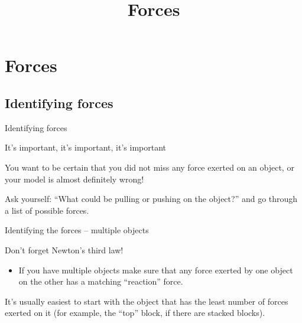 \documentclass[aspectratio=169,
hyperref={colorlinks,urlcolor=blue}
]{beamer}
\begin{document}


\section{Forces}
\label{sec:forces}
\title{Forces}
\author{\insertsubsection}



\begin{frame}
\titlepage
\thispagestyle{empty}
\end{frame}


\subsection{Identifying forces}
\label{subsec:identifyingforces}
\begin{bulletframe}{Identifying forces}
\item It’s important, it’s important, it’s important
\item You want to be certain that you did not miss any force exerted on an object, or your model is almost definitely wrong!
\item Ask yourself: ``What could be pulling or pushing on the object?'' and go through a list of possible forces.
\end{bulletframe}


\begin{bulletframe}{Identifying the forces – multiple objects}
\item Don’t forget Newton’s third law!
\begin{itemize}
\item  If you have multiple objects make sure that any force exerted by one object on the other has a matching ``reaction'' force.
\end{itemize}
\item It’s usually easiest to start with the object that has the least number of forces exerted on it (for example, the ``top'' block, if there are stacked blocks).
\end{bulletframe}




\end{document}
